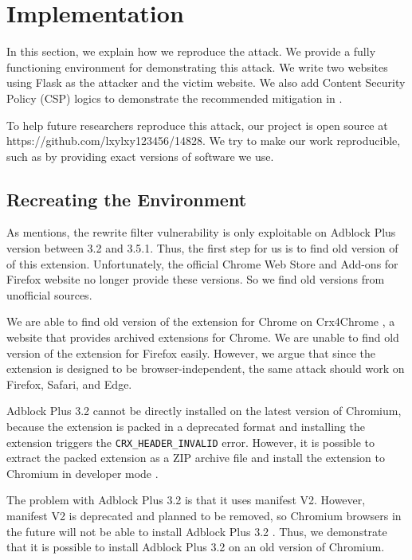 \documentclass[conference]{IEEEtran}
\begin{document}
\section{Implementation}
\label{sec:Implementation}

In this section, we explain how we reproduce the attack. We provide a fully functioning environment for demonstrating this attack. We write two websites using Flask as the attacker and the victim website. We also add Content Security Policy (CSP) logics to demonstrate the recommended mitigation in \cite{abp_code_injection}.

To help future researchers reproduce this attack, our project is open source at https://github.com/lxylxy123456/14828. We try to make our work reproducible, such as by providing exact versions of software we use.

\subsection{Recreating the Environment}

As \cite{abp_code_injection} mentions, the rewrite filter vulnerability is only exploitable on Adblock Plus version between 3.2 and 3.5.1. Thus, the first step for us is to find old version of of this extension. Unfortunately, the official Chrome Web Store and Add-ons for Firefox website no longer provide these versions. So we find old versions from unofficial sources.

We are able to find old version of the extension for Chrome on Crx4Chrome \cite{cr4chrome_abp}, a website that provides archived extensions for Chrome. We are unable to find old version of the extension for Firefox easily. However, we argue that since the extension is designed to be browser-independent, the same attack should work on Firefox, Safari, and Edge.

Adblock Plus 3.2 cannot be directly installed on the latest version of Chromium, because the extension is packed in a deprecated format and installing the extension triggers the \lstinline{CRX_HEADER_INVALID} error. However, it is possible to extract the packed extension as a ZIP archive file and install the extension to Chromium in developer mode \cite{stackoverflow_crx_header_invalid}.

The problem with Adblock Plus 3.2 is that it uses manifest V2. However, manifest V2 is deprecated and planned to be removed, so Chromium browsers in the future will not be able to install Adblock Plus 3.2 \cite{chrome_manifest_v2}. Thus, we demonstrate that it is possible to install Adblock Plus 3.2 on an old version of Chromium.
\end{document}
